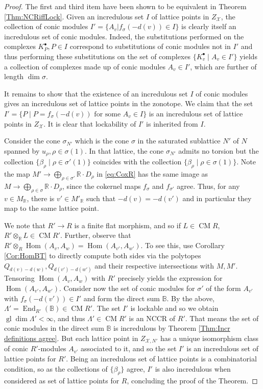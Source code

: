 \documentclass[reqno, 12pt]{amsart}
\theoremstyle{definition}
\numberwithin{equation}{section}
\newcommand{\Hom}{\operatorname{Hom}}
\newcommand{\R}{\mathbb{R}}
\newcommand{\End}{\operatorname{End}}
\newcommand{\gldim}{\operatorname{gl}\dim}
\begin{document}
\begin{proof}
The first and third item have been shown to be equivalent in Theorem \ref{Thm:NCRiffLock}. Given an incredulous set $I$ of lattice points in $Z_\mathcal{X}$, the collection of conic modules $I'=\{A_v\vert f_\sigma(-d(v))\in I\}$ is clearly itself an incredulous set of conic modules. Indeed, the substitutions performed on the complexes $K^\bullet_P, P\in I$ correspond to substitutions of conic modules not in $I'$ and thus performing these substitutions on the set of complexes $\{K_v^\bullet\mid A_v\in I'\}$ yields a collection of complexes made up of conic modules $A_v\in I'$, which are further of length $\dim \sigma$. 

It remains to show that the existence of an incredulous set $I$ of conic modules gives an incredulous set of lattice points in the zonotope. We claim that the set $I'=\{P\mid P=f_\sigma(-d(v))\text{ for some }A_v\in I\}$ is an incredulous set of lattice points in $Z_\mathcal{X}$. It is clear that lockability of $I'$ is inherited from $I$.

Consider the cone $\sigma_{N'}$ which is the cone $\sigma$ in the saturated sublattice $N'$ of $N$ spanned by $u_\rho, \rho\in\sigma(1)$. In that lattice, the cone $\sigma_{N'}$ admits no torsion but the collection $\{\beta_\rho\mid \rho\in \sigma'(1)\}$ coincides with the collection $\{\beta_\rho\mid \rho\in \sigma(1)\}$. Note the map $M'\rightarrow \bigoplus_{\rho\in \sigma'}\R\cdot D_\rho$ in \eqref{eq:CoxR} has the same image as $M\rightarrow \bigoplus_{\rho\in \sigma} \R\cdot D_\rho$, since the cokernel maps $f_{\sigma}$  and $f_{\sigma'}$ agree. Thus, for any $v\in M_\R$, there is $v'\in M'_\R$ such that $-d(v)=-d(v')$ and in particular they map to the same lattice point. 

\noindent We note that $R'\rightarrow R$ is a finite flat morphism, and so if $L\in \operatorname{CM}R$, $R'\otimes_\R L\in \operatorname{CM}R'$. Further, observe that $R'\otimes_R\Hom(A_v,A_w)=\Hom(A_{v'},A_{w'})$. To see this, use Corollary \ref{Cor:HomBT} to directly compute both sides via the polytopes $Q_{d(v)-d(w)}, Q_{d(v')-d(w')}$ and their respective intersections with $M, M'$. Tensoring $\Hom(A_v,A_w)$ with $R'$ precisely yields the expression for $\Hom(A_{v'},A_{w'})$. Consider now the set of conic modules for $\sigma'$ of the form $A_{v'}$ with $f_\sigma(-d(v'))\in I'$ and form the direct sum $\mathbb{B}$. By the above, $\Lambda'=\End_{R'}(\mathbb{B})\in \operatorname{CM}R'$. The set $I'$ is lockable and so we obtain $\gldim\Lambda'<\infty$, and thus $\Lambda'\in \operatorname{CM} R'$ is an NCCR of $R'$. That means the set of conic modules in the direct sum $\mathbb{B}$ is incredulous by Theorem \ref{Thm:Incr definitions agree}. But each lattice point in $Z_{\mathcal{X},N'}$ has a unique isomorphism class of conic $R'$-modules $A_{v'}$ associated to it, and so the set $I'$ is an incredulous set of lattice points for $R'$. Being an incredulous set of lattice points is a combinatorial condition, so as the collections of $\{\beta_\rho\}$ agree, $I'$ is also incredulous when considered as set of lattice points for $R$, concluding the proof of the Theorem.
\end{proof}
\end{document}
